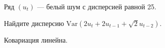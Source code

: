 
\begin{question}
Ряд \((u_t)\) --- белый шум с дисперсией равной 25.

Найдите дисперсию \(\mathrm{Var}(2u_t + 2 u_{t-1} + \sqrt{2} u_{t-2})\).
\end{question}

\begin{solution}
Ковариация линейна.
\end{solution}

